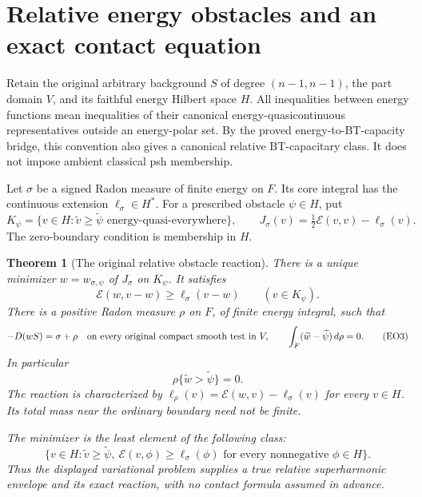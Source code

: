 \documentclass[11pt,a4paper]{article}
\numberwithin{equation}{section}
\newtheorem{theorem}{Theorem}[section]
\theoremstyle{definition}
\theoremstyle{remark}
\begin{document}


\section{Relative energy obstacles and an exact contact equation}
\label{sec:r11-energy-obstacles}

Retain the original arbitrary background $S$ of degree $(n-1,n-1)$,
the part domain $V$, and its faithful energy Hilbert space $H$.
All inequalities between energy functions mean inequalities of
their canonical energy-quasicontinuous representatives outside
an energy-polar set.  By the proved energy-to-BT-capacity bridge,
this convention also gives a canonical relative BT-capacitary class.
It does not impose ambient classical psh membership.

Let $\sigma$ be a signed Radon measure of finite energy on $F$.
Its core integral has the continuous extension $\ell_\sigma\in H^*$.
For a prescribed obstacle $\psi\in H$, put
\[
 K_\psi=\{v\in H:\widetilde v\geq\widetilde\psi
                         \text{ energy-quasi-everywhere}\},
 \qquad
 J_\sigma(v)=\tfrac12\mathcal E(v,v)-\ell_\sigma(v).
 \tag{EO1}
\]
The zero-boundary condition is membership in $H$.

\begin{theorem}[The original relative obstacle reaction]
\label{thm:r11-relative-energy-obstacle}
There is a unique minimizer $w=w_{\sigma,\psi}$ of $J_\sigma$
on $K_\psi$.  It satisfies
\[
       \mathcal E(w,v-w)\geq\ell_\sigma(v-w)
                                  \qquad(v\in K_\psi).
 \tag{EO2}
\]
There is a positive Radon measure $\rho$ on $F$, of finite
energy integral, such that
\[
             -D(wS)=\sigma+\rho
                 \quad\hbox{on every original compact smooth test in }V,
 \qquad
             \int_F(\widetilde w-\widetilde\psi)\,d\rho=0.
 \tag{EO3}
\]
In particular
\[
                  \rho\{\widetilde w>\widetilde\psi\}=0 .
 \tag{EO4}
\]
The reaction is characterized by
$\ell_\rho(v)=\mathcal E(w,v)-\ell_\sigma(v)$ for every $v\in H$.
Its total mass near the ordinary boundary need not be finite.

The minimizer is the least element of the following class:
\[
 \{v\in H:\widetilde v\geq\widetilde\psi,\
               \mathcal E(v,\phi)\geq\ell_\sigma(\phi)
                              \text{ for every nonnegative }\phi\in H\}.
 \tag{EO5}
\]
Thus the displayed variational problem supplies a true relative
superharmonic envelope and its exact reaction, with no contact
formula assumed in advance.
\end{theorem}
\end{document}
